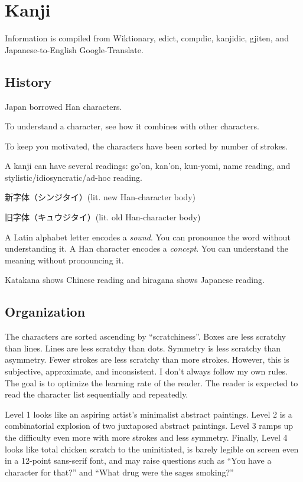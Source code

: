 \chapter{Kanji}

Information is compiled from Wiktionary,
edict, compdic, kanjidic, gjiten,
and Japanese-to-English Google-Translate.

\section{History}

Japan borrowed Han characters.

To understand a character, see how it combines with other characters.

To keep you motivated, the characters have been sorted by number of strokes.

A kanji can have several readings:
go'on, kan'on, kun-yomi, name reading, and stylistic/idiosyncratic/ad-hoc reading.

新字体（シンジタイ）(lit. new Han-character body)

旧字体（キュウジタイ）(lit. old Han-character body)

A Latin alphabet letter encodes a \emph{sound}.
You can pronounce the word without understanding it.
A Han character encodes a \emph{concept}.
You can understand the meaning without pronouncing it.

Katakana shows Chinese reading and hiragana shows Japanese reading.

\section{Organization}

The characters are sorted ascending by ``scratchiness''.
Boxes are less scratchy than lines.
Lines are less scratchy than dots.
Symmetry is less scratchy than asymmetry.
Fewer strokes are less scratchy than more strokes.
However, this is subjective, approximate, and inconsistent.
I don't always follow my own rules.
The goal is to optimize the learning rate of the reader.
The reader is expected to read the character list
sequentially and repeatedly.

Level 1 looks like
an aspiring artist's minimalist abstract paintings.
Level 2 is a combinatorial explosion
of two juxtaposed abstract paintings.
Level 3 ramps up the difficulty even more with more strokes and less symmetry.
Finally, Level 4 looks like total chicken scratch to the uninitiated,
is barely legible on screen even in a 12-point sans-serif font,
and may raise questions such as
``You have a character for that?''
and
``What drug were the sages smoking?''
